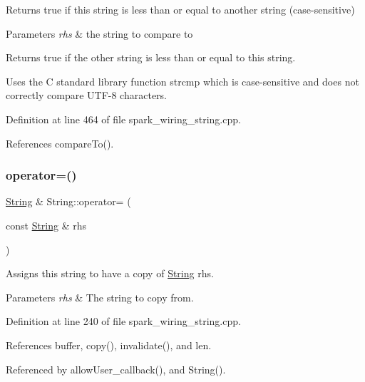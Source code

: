 Returns true if this string is less than or equal to another string (case-\/sensitive) 


\begin{DoxyParams}{Parameters}
{\em rhs} & the string to compare to\\
\hline
\end{DoxyParams}
\begin{DoxyReturn}{Returns}
true if the other string is less than or equal to this string.
\end{DoxyReturn}
Uses the C standard library function strcmp which is case-\/sensitive and does not correctly compare U\+T\+F-\/8 characters. 

Definition at line 464 of file spark\+\_\+wiring\+\_\+string.\+cpp.



References compare\+To().

\mbox{\label{class_string_a70b3aba8ac7a57e3bb48a52a5d64a88b}} 
\subsubsection{\texorpdfstring{operator=()}{operator=()}\hspace{0.1cm}{\footnotesize\ttfamily [1/3]}}
{\footnotesize\ttfamily \hyperlink{class_string}{String} \& String\+::operator= (\begin{DoxyParamCaption}\item[{const \hyperlink{class_string}{String} \&}]{rhs }\end{DoxyParamCaption})}



Assigns this string to have a copy of \hyperlink{class_string}{String} rhs. 


\begin{DoxyParams}{Parameters}
{\em rhs} & The string to copy from. \\
\hline
\end{DoxyParams}


Definition at line 240 of file spark\+\_\+wiring\+\_\+string.\+cpp.



References buffer, copy(), invalidate(), and len.



Referenced by allow\+User\+\_\+callback(), and String().

\mbox{\label{class_string_a0138caa55ac6d8b5bcd1fa7bb484a831}} 
